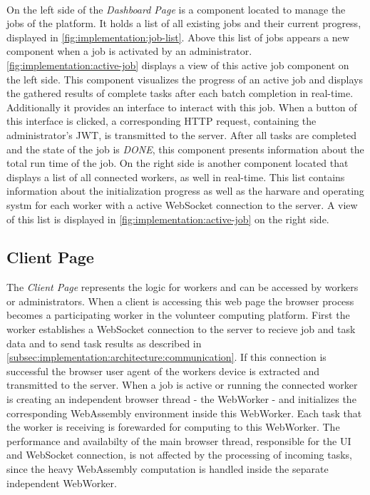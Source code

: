 ~\\
On the left side of the \emph{Dashboard Page} is a component located to manage the jobs of the platform. It holds a list of all existing jobs and their current progress, displayed in \autoref{fig:implementation:job-list}. Above this list of jobs appears a new component when a job is activated by an administrator. \autoref{fig:implementation:active-job} displays a view of this active job component on the left side. This component visualizes the progress of an active job and displays the gathered results of complete tasks after each batch completion in real-time. Additionally it provides an interface to interact with this job. When a button of this interface is clicked, a corresponding \acs{HTTP} request, containing the administrator's \ac{JWT}, is transmitted to the server. After all tasks are completed and the state of the job is \emph{DONE}, this component presents information about the total run time of the job. On the right side is another component located that displays a list of all connected workers, as well in real-time. This list contains information about the initialization progress as well as the harware and operating systm for each worker with a active WebSocket connection to the server. A view of this list is displayed in \autoref{fig:implementation:active-job} on the right side.

\subsection{Client Page}
\label{subsec:implementation:client-page}
The \emph{Client Page} represents the logic for workers and can be accessed by workers or administrators. When a client is accessing this web page the browser process becomes a participating worker in the volunteer computing platform. First the worker establishes a WebSocket connection to the server to recieve job and task data and to send task results as described in \autoref{subsec:implementation:architecture:communication}. If this connection is successful the browser user agent of the workers device is extracted and transmitted to the server. When a job is active or running the connected worker is creating an independent browser thread - the WebWorker - and initializes the corresponding WebAssembly environment inside this WebWorker. Each task that the worker is receiving is forewarded for computing to this WebWorker. The performance and availabilty of the main browser thread, responsible for the \ac{UI} and WebSocket connection, is not affected by the processing of incoming tasks, since the heavy WebAssembly computation is handled inside the separate independent WebWorker.

